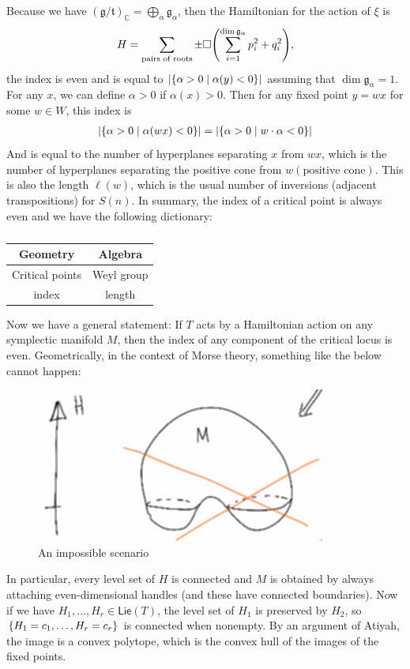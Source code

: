 \documentclass[leqno, openany]{memoir}
\theoremstyle{definition}
\theoremstyle{remark}
\theoremstyle{plain}
\theoremstyle{definition}
\theoremstyle{remark}
\newcommand{\C}{\mathbb{C}}
\newcommand{\mf}[1]{\mathfrak{#1}}
\newcommand{\ms}[1]{\mathsf{#1}}
\begin{document}
Because we have $(\mf{g}/\mf{t})_{\C} = \bigoplus_{\alpha} \mf{g}_{\alpha}$, then the Hamiltonian for the action of $\xi$ is
\[ H = \sum_{\text{pairs of roots}} \pm \square \qty(\sum_{i=1}^{\dim \mf{g}_{\alpha}} p_i^2 + q_i^2 ), \]
the index is even and is equal to $\abs{ \qty{\alpha > 0 \mid \alpha(y) < 0} }$ assuming that $\dim \mf{g}_{\alpha} = 1$. For any $x$, we can define $\alpha > 0$ if $\alpha(x) > 0$. Then for any fixed point $y = w x$ for some $w \in W$, this index is 
\begin{align*}
    \abs{\qty{\alpha > 0 \mid \alpha(wx) < 0}} &= \abs{\qty{\alpha > 0 \mid w \cdot \alpha < 0}} \\
\end{align*}
And is equal to the number of hyperplanes separating $x$ from $wx$, which is the number of hyperplanes separating the positive cone from $w(\text{positive cone})$. This is also the length $\ell(w)$, which is the usual number of inversions (adjacent transpositions) for $S(n)$. In summary, the index of a critical point is always even and we have the following dictionary:
\begin{table}[H]
    \centering
    \caption{}
    \label{tab:label}
    \begin{tabular}{cc}
    \toprule
    Geometry & Algebra \\
    \midrule
    Critical points & Weyl group \\
    index & length \\
    \bottomrule
    \end{tabular}
\end{table}
Now we have a general statement: If $T$ acts by a Hamiltonian action on any symplectic manifold $M$, then the index of any component of the critical locus is even. Geometrically, in the context of Morse theory, something like the below cannot happen:
\begin{figure}[H]
    \centering
    \includegraphics[scale=0.6]{hamiltonian.png}
    \caption{An impossible scenario}%
    \label{fig:hamiltonian}
\end{figure}
In particular, every level set of $H$ is connected and $M$ is obtained by always attaching even-dimensional handles (and these have connected boundaries). Now if we have $H_1, \ldots, H_r \in \ms{Lie}(T)$, the level set of $H_1$ is preserved by $H_2$, so $\qty{H_1 = c_1, \ldots, H_r = c_r}$ is connected when nonempty. By an argument of Atiyah, the image is a convex polytope, which is the convex hull of the images of the fixed points. 
\end{document}
